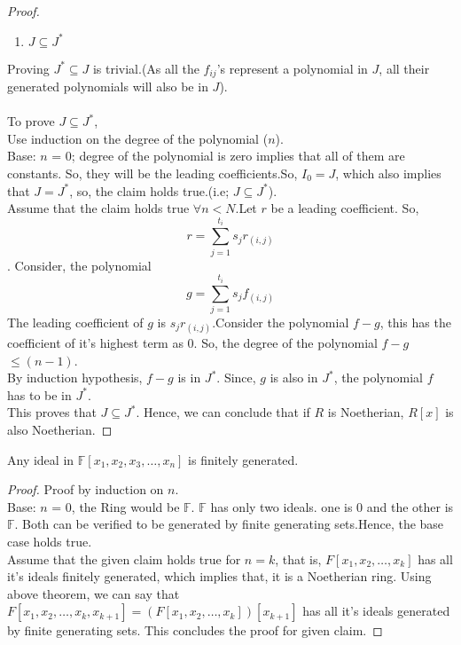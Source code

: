 \begin{proof}
\begin{enumerate}
\item $J\subseteq J^*$
\end{enumerate}
Proving $J^* \subseteq J$ is trivial.(As all the $f_{ij}$'s represent a polynomial in $J$, all their generated polynomials will also be in $J$).\\\\
To prove $J\subseteq J^*$,\\
Use induction on the degree of the polynomial ($n$).\\
Base: $n$ = 0; degree of the polynomial is zero implies that all of them are constants. So, they will be the leading coefficients.So, $I_0=J$, which also implies that $J=J^*$, so, the claim holds true.(i.e; $J \subseteq J^*$).\\
Assume that the claim holds true $\forall n < N$.Let $r$ be a leading coefficient. So,$$r=\sum_{j=1}^{t_i} s_j r_{(i,j)} $$.
Consider, the polynomial $$ g = \sum_{j=1}^{t_i}s_jf_{(i,j)}$$
The leading coefficient of $g$ is $s_jr_{(i,j)}$.Consider the polynomial $f-g$, this has the coefficient of it's highest term as 0. So, the degree of the polynomial $f-g$ $ \leq (n-1)$.\\
By induction hypothesis, $f-g$ is in $J^*$. Since, $g$ is also in $J^*$, the polynomial $f$ has to be in $J^*$.\\
This proves that $J \subseteq J^*$. Hence, we can conclude that if $R$ is Noetherian, $R[x]$ is also Noetherian.
\end{proof}
\begin{theorem}
Any ideal in $\mathbb{F}[x_1,x_2,x_3,\ldots,x_n]$ is finitely generated.
\end{theorem}
\begin{proof}
Proof by induction on $n$.\\
Base: $n$ = 0, the Ring would be $\mathbb{F}$. $\mathbb{F}$ has only two ideals. one is ${0}$ and the other is $\mathbb{F}$. Both can be verified to be generated by finite generating sets.Hence, the base case holds true.\\
Assume that the given claim holds true for $n=k$, that is, $F[x_1,x_2,\ldots,x_k]$ has all it's ideals finitely generated, which implies that, it is a Noetherian ring. Using above theorem, we can say that $F[x_1,x_2,\ldots,x_k,x_{k+1}] = (F[x_1,x_2,\ldots,x_k])[x_{k+1}]$ has all it's ideals generated by finite generating sets. This concludes the proof for given claim.
\end{proof}

